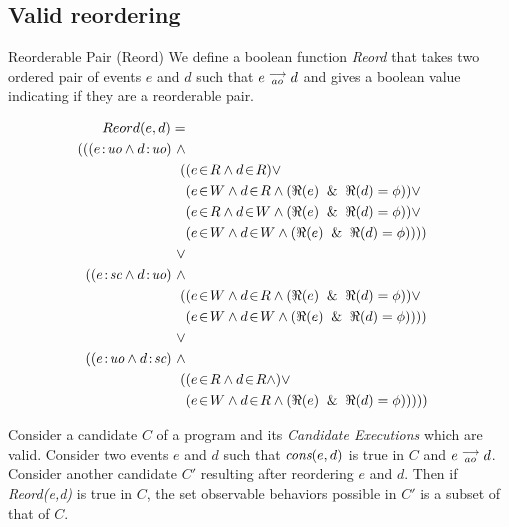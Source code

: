 \subsection{Valid reordering}

    \begin{definition}{Reorderable Pair (Reord)}
        We define a boolean function \emph{Reord} that takes two ordered pair of events $e$ and $d$ such that $e\stackrel{\longrightarrow}{_{ao}}d$ and gives a boolean value indicating if they are a reorderable pair. 
        
         \begin{align*}
            Reord(e,d) = \\
            (
            ((\et{e}{uo} \wedge \et{d}{uo}) \ \wedge \\ 
                \quad ( 
                        &(\event{e}{R} \wedge \event{d}{R}) \vee \\ 
                        &(\event{e}{W} \wedge \event{d}{R} \wedge (\Re(e) \And \Re(d) = \phi)) \vee \\
                        &(\event{e}{R} \wedge \event{d}{W} \wedge (\Re(e) \And \Re(d) = \phi)) \vee \\
                        &(\event{e}{W} \wedge \event{d}{W} \wedge (\Re(e) \And \Re(d) = \phi)) 
                    )
            ) \\ \vee \\
            ((\et{e}{sc} \wedge \et{d}{uo}) \ \wedge \\
                \quad (
                        & (\event{e}{W} \wedge \event{d}{R} \wedge (\Re(e) \And \Re(d) = \phi)) \vee \\
                        & (\event{e}{W} \wedge \event{d}{W} \wedge (\Re(e) \And \Re(d) = \phi)) 
                    )
            ) \\ \vee \\
            ((\et{e}{uo} \wedge \et{d}{sc}) \ \wedge \\
                \quad (
                        & (\event{e}{R} \wedge \event{d}{R} \wedge) \vee \\
                        & (\event{e}{W} \wedge \event{d}{R} \wedge (\Re(e) \And \Re(d) = \phi)) 
                    )
            )
            )
    \end{align*}
    \end{definition}

\begin{theorem} 

    Consider a candidate $C$ of a program and its \textit{Candidate Executions} which are valid. Consider two events $e$ and $d$ such that $\textit{cons}(e,d)$ is true in $C$ and  $e\stackrel{\longrightarrow}{_{ao}}d$. Consider another candidate $C'$ resulting after reordering $e$ and $d$. 
    Then if \emph{Reord(e,d)} is true in $C$, the set observable behaviors possible in $C'$ is a subset of that of $C$. 
\end{theorem}

